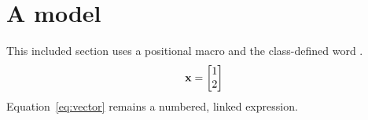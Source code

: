 \section{A model}\label{sec:model}
This included section uses a positional macro and the class-defined word \notion{}.
\begin{equation}
\label{eq:vector}
\mathbf{x} = \begin{bmatrix}1 \\ 2\end{bmatrix}
\end{equation}
Equation~\eqref{eq:vector} remains a numbered, linked expression.
